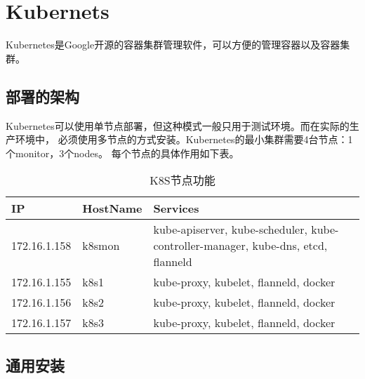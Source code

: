 \chapter{Kubernets}
Kubernetes是Google开源的容器集群管理软件，可以方便的管理容器以及容器集群。

\section{部署的架构}
Kubernetes可以使用单节点部署，但这种模式一般只用于测试环境。而在实际的生产环境中，
必须使用多节点的方式安装。Kubernetes的最小集群需要4台节点：1个monitor，3个nodes。
每个节点的具体作用如下表。
\begin{table}
  \caption{K8S节点功能}
  \label{tab:k8s_service_mapping}
  \begin{tabularx}{\textwidth}{|l|l|X|}
  \hline
  IP & HostName & Services\\ \hline
  172.16.1.158 & k8smon & kube-apiserver, kube-scheduler, kube-controller-manager, kube-dns, etcd, flanneld\\
  172.16.1.155 & k8s1 & kube-proxy, kubelet, flanneld, docker \\
  172.16.1.156 & k8s2 & kube-proxy, kubelet, flanneld, docker \\
  172.16.1.157 & k8s3 & kube-proxy, kubelet, flanneld, docker \\
  \hline
  \end{tabularx}
\end{table}

\section{通用安装}

